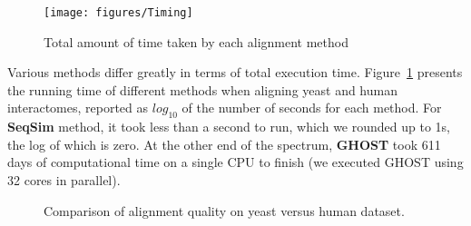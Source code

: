 \documentclass[10pt, journal, compsoc, final]{IEEEtran}
\begin{document}
\begin{figure}[!h]
\texttt{[image: figures/Timing]}
\caption{Total amount of time taken by each alignment method}
\label{fig:timing}
\end{figure}


Various methods differ greatly in terms of total execution time. Figure~\ref{fig:timing} presents the running time of different methods when aligning yeast and human interactomes, reported as $log_{10}$ of the number of seconds for each method. For \textbf{SeqSim} method, it took less than a second to run, which we rounded up to 1s, the log of which is zero. At the other end of the spectrum, \textbf{GHOST} took 611 days of computational time on a single CPU to finish (we executed GHOST using 32 cores in parallel). 




\begin{figure*}[!t]
\centering
\hfil {}\hfil {}\hfil
 \hfil
 \caption{Comparison of alignment quality on yeast versus human dataset.}
 \label{fig:SCvsHS_validation}
\end{figure*}
\end{document}
